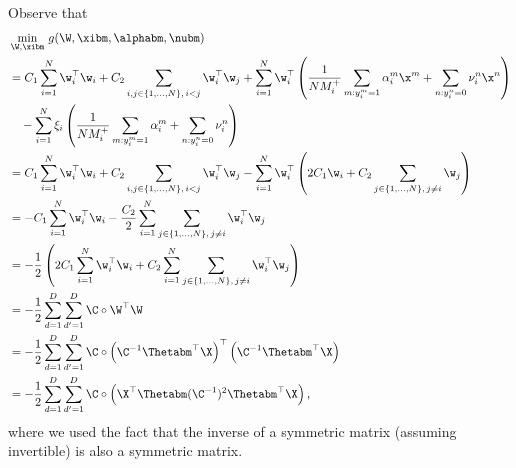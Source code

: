 Observe that
\begin{equation*}
\begin{aligned}
&\min_{\W, \xibm} \, g(\W, \xibm, \alphabm, \nubm) \\
&= C_1 \sum_{i=1}^{N} \w_i^\top \w_i + C_2 \sum_{i, j \in \{1,\dots,N\}, \, i < j} \w_i^\top \w_j
   + \sum_{i = 1}^{N} \w_i^\top \left( \frac{1}{N M_i^+} \sum_{m: y_i^m = 1} \alpha_i^m \x^m + \sum_{n: y_i^n = 0} \nu_i^n \x^n \right) \\
& \quad - \sum_{i = 1}^{N} \xi_i \left( \frac{1}{N M_i^+} \sum_{m: y_i^m = 1} \alpha_i^m + \sum_{n: y_i^n = 0} \nu_i^n \right) \\
&= C_1 \sum_{i=1}^{N} \w_i^\top \w_i + C_2 \sum_{i, j \in \{1,\dots,N\}, \, i < j} \w_i^\top \w_j 
   - \sum_{i = 1}^{N} \w_i^\top \left( 2C_1 \w_i + C_2 \sum_{j \in \{1,\dots,N\}, \, j \ne i} \w_j \right) \\
&= - C_1 \sum_{i=1}^{N} \w_i^\top \w_i - \frac{C_2}{2} \sum_{i=1}^{N} \sum_{j \in \{1,\dots,N\}, \, j \ne i} \w_i^\top \w_j \\
&= - \frac{1}{2} \left( 2C_1 \sum_{i=1}^{N} \w_i^\top \w_i + C_2 \sum_{i=1}^{N} \sum_{j \in \{1,\dots,N\}, \, j \ne i} \w_i^\top \w_j \right) \\
&= - \frac{1}{2} \sum_{d=1}^{D} \sum_{d'=1}^{D} \C \circ \W^\top \W \\
&= - \frac{1}{2} \sum_{d=1}^{D} \sum_{d'=1}^{D} \C \circ \left( \C^{-1} \Thetabm^\top \X \right)^\top  \left( \C^{-1} \Thetabm^\top \X \right) \\
&= - \frac{1}{2} \sum_{d=1}^{D} \sum_{d'=1}^{D} \C \circ \left( \X^\top \Thetabm (\C^{-1})^2 \Thetabm^\top \X \right), \\
\end{aligned}
\end{equation*}
where we used the fact that the inverse of a symmetric matrix (assuming invertible) is also a symmetric matrix.

